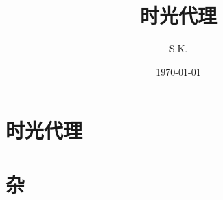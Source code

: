 \documentclass[11pt]{easybook}
\begin{document}
\title{时光代理}
\author{S.K.}
\date{\today}




\maketitle
\tableofcontents%


\chapter{时光代理}

    \section{}





     
\appendix
\chapter{杂}


\begin{lstlisting}


\end{lstlisting}


   



  
\end{document}
